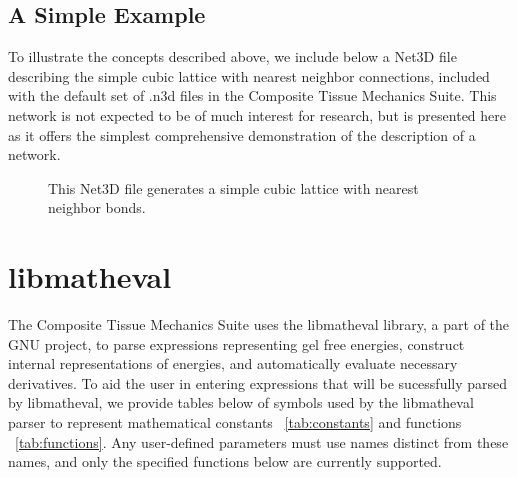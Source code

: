 \documentclass{article}
\begin{document}
\subsection{A Simple Example}
To illustrate the concepts described above, we include below a Net3D file
describing the simple cubic lattice with nearest neighbor connections, included
with the default set of .n3d files in the Composite Tissue Mechanics Suite. This
network is not expected to be of much interest for research, but is presented
here as it offers the simplest comprehensive demonstration of the description
of a network.

\begin{figure}[!htb]
\caption{This Net3D file generates a simple cubic lattice with nearest
neighbor bonds.}
\label{fig:sc_n3d_file}
\end{figure}

\section{libmatheval}
\label{sec:matheval}
The Composite Tissue Mechanics Suite uses the libmatheval library, a part of
the GNU project, to parse expressions representing gel free energies,
construct internal representations of energies, and automatically evaluate
necessary derivatives. To aid the user in entering expressions that will be
sucessfully parsed by libmatheval, we provide tables below of symbols used
by the libmatheval parser to represent mathematical constants
~\ref{tab:constants} and functions ~\ref{tab:functions}. Any user-defined
parameters must use names distinct from these names, and only the specified
functions below are currently supported.
\end{document}
